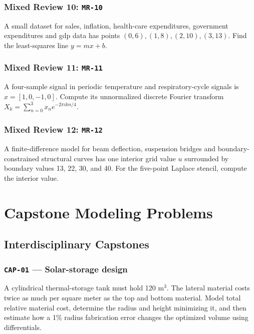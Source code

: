 \documentclass[11pt]{book}
\newcommand{\pid}[1]{\texttt{#1}}
\newcommand{\workspace}{\par\vspace{0.7in}\hrulefill\par\vspace{0.55in}\hrulefill\par}
\begin{document}
\section*{Mixed Review 10: \pid{MR-10}}
\begin{problembox}A small dataset for sales, inflation, health-care expenditures, government expenditures and gdp data has points $(0,6),(1,8),(2,10),(3,13)$. Find the least-squares line $y=mx+b$.\end{problembox}
\workspace
\section*{Mixed Review 11: \pid{MR-11}}
\begin{problembox}A four-sample signal in periodic temperature and respiratory-cycle signals is $x=[1,0,-1,0]$. Compute its unnormalized discrete Fourier transform $X_k=\sum_{n=0}^3 x_ne^{-2\pi i kn/4}$.\end{problembox}
\workspace
\section*{Mixed Review 12: \pid{MR-12}}
\begin{problembox}A finite-difference model for beam deflection, suspension bridges and boundary-constrained structural curves has one interior grid value $u$ surrounded by boundary values 13, 22, 30, and 40. For the five-point Laplace stencil, compute the interior value.\end{problembox}
\workspace
\part{Capstone Modeling Problems}
\chapter{Interdisciplinary Capstones}
\section*{\pid{CAP-01} — Solar-storage design}
\begin{problembox}A cylindrical thermal-storage tank must hold 120 m$^3$. The lateral material costs twice as much per square meter as the top and bottom material. Model total relative material cost, determine the radius and height minimizing it, and then estimate how a 1\% radius fabrication error changes the optimized volume using differentials.\end{problembox}
\workspace\workspace
\end{document}
